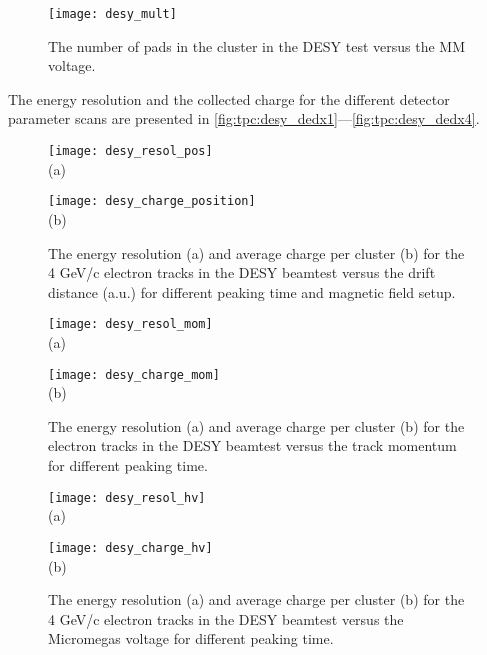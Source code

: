 \documentclass[../main.tex]{subfiles}
\begin{document}
\begin{figure}[!ht]
  \centering
  \texttt{[image: desy\_mult]}
  \caption{The number of pads in the cluster in the DESY test versus the MM voltage.}
  \label{fig:tpc:desy_mult}
\end{figure}

The energy resolution and the collected charge for the different detector parameter scans are presented in \autoref{fig:tpc:desy_dedx1}---\ref{fig:tpc:desy_dedx4}.

\begin{figure}[!ht]
  \centering
  \begin{minipage}{0.49\linewidth}
    \centering
    \texttt{[image: desy\_resol\_pos]} \\ (a)
  \end{minipage}
  \begin{minipage}{0.49\linewidth}
    \centering
    \texttt{[image: desy\_charge\_position]} \\ (b)
  \end{minipage}
  \caption{The energy resolution (a) and average charge per cluster (b) for the 4 GeV/c electron tracks in the DESY beamtest versus the drift distance (a.u.) for different peaking time and magnetic field setup.}
  \label{fig:tpc:desy_dedx1}
\end{figure}

\begin{figure}[!ht]
  \centering
  \begin{minipage}{0.49\linewidth}
    \centering
    \texttt{[image: desy\_resol\_mom]} \\ (a)
  \end{minipage}
  \begin{minipage}{0.49\linewidth}
    \centering
    \texttt{[image: desy\_charge\_mom]} \\ (b)
  \end{minipage}
  \caption{The energy resolution (a) and average charge per cluster (b) for the electron tracks in the DESY beamtest versus the track momentum for different peaking time.}
  \label{fig:tpc:desy_dedx2}
\end{figure}

\begin{figure}[!ht]
  \centering
  \begin{minipage}{0.49\linewidth}
    \centering
    \texttt{[image: desy\_resol\_hv]} \\ (a)
  \end{minipage}
  \begin{minipage}{0.49\linewidth}
    \centering
    \texttt{[image: desy\_charge\_hv]} \\ (b)
  \end{minipage}
  \caption{The energy resolution (a) and average charge per cluster (b) for the 4 GeV/c electron tracks in the DESY beamtest versus the Micromegas voltage for different peaking time.}
  \label{fig:tpc:desy_dedx3}
\end{figure}
\end{document}
